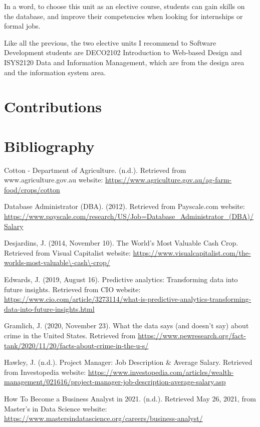 \documentclass[12pt]{article}
\begin{document}
In a word, to choose this unit as an elective course, students can gain skills on the database, and improve their competencies when looking for internships or formal jobs.

Like all the previous, the two elective units I recommend to Software Development students are DECO2102 Introduction to Web-based Design and ISYS2120 Data and Information Management, which are from the design area and the information system area.


\newpage
\section{Contributions}



\newpage

\section{Bibliography}

Cotton - Department of Agriculture. (n.d.). Retrieved from www.agriculture.gov.au website:
\url{https://www.agriculture.gov.au/ag-farm-food/crops/cotton}

Database Administrator (DBA). (2012). Retrieved from Payscale.com website:
\url{https://www.payscale.com/research/US/Job=Database\_Administrator\_(DBA)/Salary}

Desjardins, J. (2014, November 10). The World’s Most Valuable Cash Crop. Retrieved from Visual Capitalist website:
\url{https://www.visualcapitalist.com/the-worlds-most-valuable\-cash\-crop/}

Edwards, J. (2019, August 16). Predictive analytics: Transforming data into future insights. Retrieved from CIO website:
\url{https://www.cio.com/article/3273114/what-is-predictive-analytics-transforming-data-into-future-insights.html}

Gramlich, J. (2020, November 23). What the data says (and doesn't say) about crime in the United States. Retrieved from \url{https://www.pewresearch.org/fact-tank/2020/11/20/facts-about-crime-in-the-u-s/}

Hawley, J. (n.d.). Project Manager: Job Description \& Average Salary. Retrieved from Investopedia website:
\url{https://www.investopedia.com/articles/wealth-management/021616/project-manager-job-description-average-salary.asp}

How To Become a Business Analyst in 2021. (n.d.). Retrieved May 26, 2021, from Master’s in Data Science website:
\url{https://www.mastersindatascience.org/careers/business-analyst/}
\end{document}
